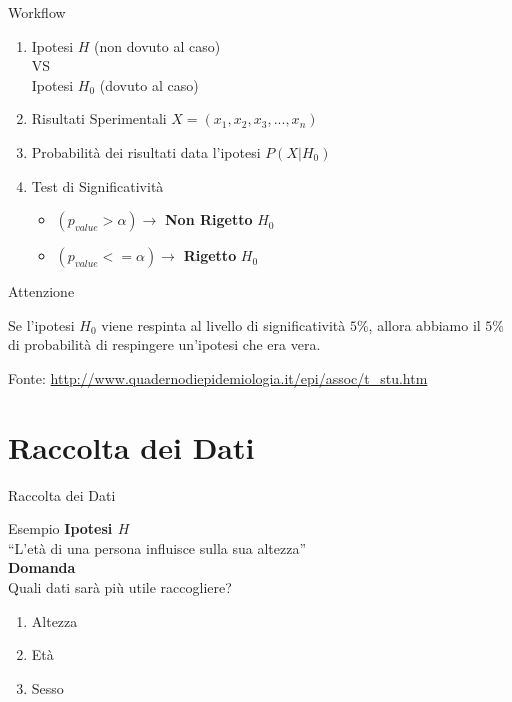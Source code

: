 \documentclass[10pt]{beamer}
\begin{document}
	\begin{frame}{Workflow}

		\begin{enumerate}

			\item Ipotesi $H$ (non dovuto al caso)\\VS\\Ipotesi $H_0$ (dovuto al caso)
			\item Risultati Sperimentali $X=(x_1,x_2,x_3,...,x_n)$
			\item Probabilità dei risultati data l'ipotesi $P(X|H_0)$
			\item Test di Significatività
			
			\begin{itemize}

				\item $(p_{value}>\alpha)\rightarrow$ \textbf{Non Rigetto} $H_0$
				\item $(p_{value}<=\alpha)\rightarrow$ \textbf{Rigetto} $H_0$

			\end{itemize}

		\end{enumerate}

		\begin{alertblock}{Attenzione}
	
			Se l'ipotesi $H_0$ viene respinta al livello di significatività $5$\%, allora abbiamo il $5$\% di probabilità di respingere un'ipotesi che era vera.
	
		\end{alertblock}
	
		\tiny{Fonte: \url{http://www.quadernodiepidemiologia.it/epi/assoc/t_stu.htm}}

	\end{frame}

	\section{Raccolta dei Dati}

		\begin{frame}{Raccolta dei Dati}

			\begin{exampleblock}{Esempio}
				\textbf{Ipotesi $H$}\\
				“L'età di una persona influisce sulla sua altezza”\\
				\textbf{Domanda}\\
				Quali dati sarà più utile raccogliere?\\
				\begin{enumerate}
					\item Altezza
					\item Età
					\item Sesso
				\end{enumerate}
			\end{exampleblock}
	
		\end{frame}
\end{document}
